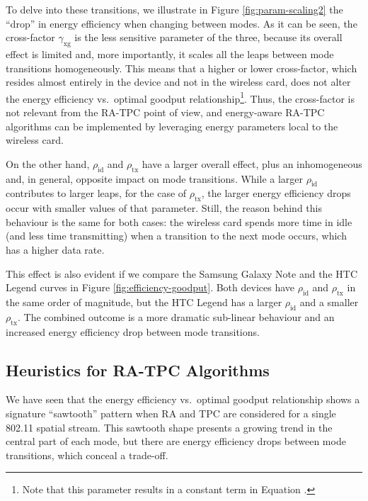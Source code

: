 \documentclass[twoside,nohyper]{tufte-book}
\makeatletter
\let\orig@maketag@@@\maketag@@@
\renewcommand{\eqref}[1]{\textup{\let\maketag@@@\orig@maketag@@@\tagform@{\ref{#1}}}}
\def\maketag@@@#1{\hbox{\rlap{\kern\marginparsep\m@th\normalfont#1}\kern1sp}}
\theoremstyle{definition}
\theoremstyle{definition}
\theoremstyle{definition}
\theoremstyle{remark}
\makeatother
\begin{document}
To delve into these transitions, we illustrate in Figure
\ref{fig:param-scaling2} the ``drop'' in energy efficiency when changing
between modes. As it can be seen, the cross-factor
\(\gamma_\mathrm{xg}\) is the less sensitive parameter of the three,
because its overall effect is limited and, more importantly, it scales
all the leaps between mode transitions homogeneously. This means that a
higher or lower cross-factor, which resides almost entirely in the
device and not in the wireless card, does not alter the energy
efficiency vs.~optimal goodput relationship\footnote{Note that this
  parameter results in a constant term in Equation
  \eqref{eq:energyperframe}.}. Thus, the cross-factor is not relevant from
the RA-TPC point of view, and energy-aware RA-TPC algorithms can be
implemented by leveraging energy parameters local to the wireless card.

On the other hand, \(\rho_\mathrm{id}\) and \(\rho_\mathrm{tx}\) have a
larger overall effect, plus an inhomogeneous and, in general, opposite
impact on mode transitions. While a larger \(\rho_\mathrm{id}\)
contributes to larger leaps, for the case of \(\rho_\mathrm{tx}\), the
larger energy efficiency drops occur with smaller values of that
parameter. Still, the reason behind this behaviour is the same for both
cases: the wireless card spends more time in idle (and less time
transmitting) when a transition to the next mode occurs, which has a
higher data rate.

This effect is also evident if we compare the Samsung Galaxy Note and
the HTC Legend curves in Figure \ref{fig:efficiency-goodput}. Both
devices have \(\rho_\mathrm{id}\) and \(\rho_\mathrm{tx}\) in the same
order of magnitude, but the HTC Legend has a larger \(\rho_\mathrm{id}\)
and a smaller \(\rho_\mathrm{tx}\). The combined outcome is a more
dramatic sub-linear behaviour and an increased energy efficiency drop
between mode transitions.

\subsection{Heuristics for RA-TPC
Algorithms}\label{heuristics-for-ra-tpc-algorithms}

We have seen that the energy efficiency vs.~optimal goodput relationship
shows a signature ``sawtooth'' pattern when RA and TPC are considered
for a single 802.11 spatial stream. This sawtooth shape presents a
growing trend in the central part of each mode, but there are energy
efficiency drops between mode transitions, which conceal a trade-off.
\end{document}
